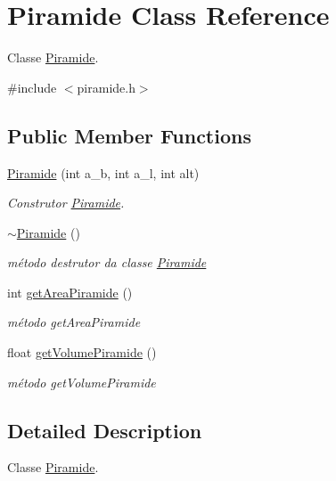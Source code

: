 \hypertarget{classPiramide}{}\section{Piramide Class Reference}
\label{classPiramide}


Classe \hyperlink{classPiramide}{Piramide}.  




{\ttfamily \#include $<$piramide.\+h$>$}

\subsection*{Public Member Functions}
\begin{DoxyCompactItemize}
\item 
\hyperlink{classPiramide_abd75e66c4d7da8716f8dfb4d5fb0a914}{Piramide} (int a\+\_\+b, int a\+\_\+l, int alt)
\begin{DoxyCompactList}\small\item\em Construtor \hyperlink{classPiramide}{Piramide}. \end{DoxyCompactList}\item 
\hyperlink{classPiramide_a1fdd51b594ba1fe14e094c7f1a6e5e79}{$\sim$\+Piramide} ()
\begin{DoxyCompactList}\small\item\em método destrutor da classe \hyperlink{classPiramide}{Piramide} \end{DoxyCompactList}\item 
int \hyperlink{classPiramide_a01b5aee1a48de737364e60b51b969592}{get\+Area\+Piramide} ()
\begin{DoxyCompactList}\small\item\em método get\+Area\+Piramide \end{DoxyCompactList}\item 
float \hyperlink{classPiramide_a5bde3120341d860185d7131b31214aa5}{get\+Volume\+Piramide} ()
\begin{DoxyCompactList}\small\item\em método get\+Volume\+Piramide \end{DoxyCompactList}\end{DoxyCompactItemize}


\subsection{Detailed Description}
Classe \hyperlink{classPiramide}{Piramide}. 

